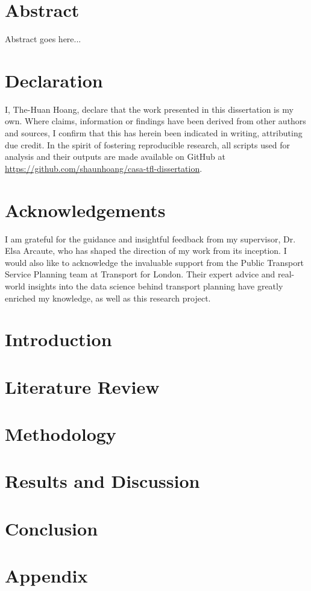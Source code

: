\documentclass[12pt]{report}
\begin{document}


\chapter*{Abstract}
Abstract goes here...

\chapter*{Declaration}
I, The-Huan Hoang, declare that the work presented in this dissertation is my own. Where claims, information or findings have been derived from other authors and sources, I confirm that this has herein been indicated in writing, attributing due credit. In the spirit of fostering reproducible research, all scripts used for analysis and their outputs are made available on GitHub at \url{https://github.com/shaunhoang/casa-tfl-dissertation}.

\chapter*{Acknowledgements}
I am grateful for the guidance and insightful feedback from my supervisor, Dr. Elsa Arcaute, who has shaped the direction of my work from its inception. I would also like to acknowledge the invaluable support from the Public Transport Service Planning team at Transport for London. Their expert advice and real-world insights into the data science behind transport planning have greatly enriched my knowledge, as well as this research project.

\tableofcontents

\listoffigures

\listoftables

\chapter{Introduction}


\chapter{Literature Review}


\chapter{Methodology}


\chapter{Results and Discussion}


\chapter{Conclusion}


\appendix
\chapter{Appendix}


\printbibliography{}
\end{document}
